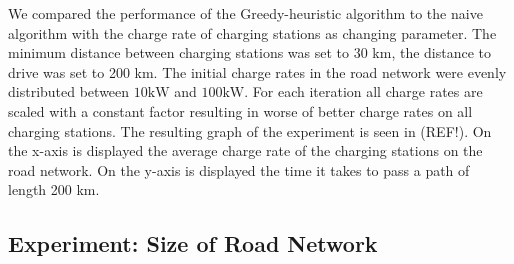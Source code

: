 We compared the performance of the Greedy-heuristic algorithm to the naive algorithm with the charge rate of charging stations as changing parameter. The minimum distance between charging stations was set to 30 km, the distance to drive was set to 200 km. The initial charge rates in the road network were evenly distributed between $10 \si{\kW}$ and $100 \si{\kW}$. For each iteration all charge rates are scaled with a constant factor resulting in worse of better charge rates on all charging stations. The resulting graph of the experiment is seen in (REF!). On the x-axis is displayed the average charge rate of the charging stations on the road network. On the y-axis is displayed the time it takes to pass a path of length 200 km. 

\subsection{Experiment: Size of Road Network}

